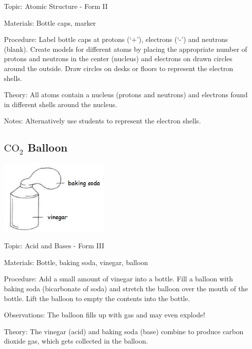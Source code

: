 \begin{multicols}{2}
\begin{description*}
\item[Topic:]{Atomic Structure - Form II}
\item[Materials:]{Bottle caps, marker}
\item[Procedure:]{Label bottle caps at protons (`+'), electrons (`-') and neutrons (blank). Create models for different atoms by placing the appropriate number of protons and neutrons in the center (nucleus) and electrons on drawn circles around the outside. Draw circles on desks or
floors to represent the electron
shells. }
\item[Theory:]{All atoms contain a nucleus
(protons and neutrons) and
electrons found in different shells around the nucleus. }
\item[Notes:]{Alternatively use students
to represent the electron shells.}
\end{description*}

\subsection{$\mathrm{CO_2}$ Balloon}

\begin{center}
\includegraphics[width=0.4\textwidth]{./img/vso/co2-balloon.jpg}
\end{center}

\begin{description*}
\item[Topic:]{Acid and Bases - Form III}
\item[Materials:]{Bottle, baking soda, vinegar, balloon}
\item[Procedure:]{Add a small amount of vinegar into a bottle. Fill a balloon with baking soda (bicarbonate of soda) and stretch the balloon over the mouth of the bottle. Lift the balloon to empty the contents into the bottle.}
\item[Observations:]{The balloon fills up with gas and may even explode!}
\item[Theory:]{The vinegar (acid) and baking soda (base) combine to produce carbon dioxide gas, which gets collected in the balloon.}
\end{description*}


\end{multicols}

